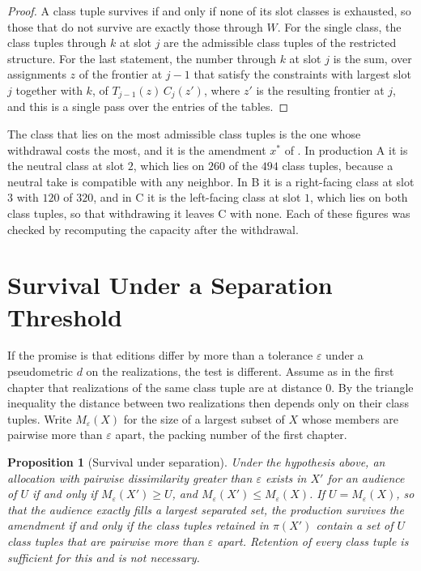 \documentclass[11pt,twoside,openright]{book}
\theoremstyle{plain}
\newtheorem{proposition}[theorem]{Proposition}
\theoremstyle{definition}
\theoremstyle{remark}
\begin{document}
\begin{proof}
A class tuple survives if and only if none of its slot classes is exhausted, so those that do not survive are exactly those through $W$. For the single class, the class tuples through $k$ at slot $j$ are the admissible class tuples of the restricted structure. For the last statement, the number through $k$ at slot $j$ is the sum, over assignments $z$ of the frontier at $j-1$ that satisfy the constraints with largest slot $j$ together with $k$, of $T_{j-1}(z)\,C_j(z')$, where $z'$ is the resulting frontier at $j$, and this is a single pass over the entries of the tables.
\end{proof}

The class that lies on the most admissible class tuples is the one whose withdrawal costs the most, and it is the amendment $x^\ast$ of . In production A it is the neutral class at slot $2$, which lies on $260$ of the $494$ class tuples, because a neutral take is compatible with any neighbor. In B it is a right-facing class at slot $3$ with $120$ of $320$, and in C it is the left-facing class at slot $1$, which lies on both class tuples, so that withdrawing it leaves C with none. Each of these figures was checked by recomputing the capacity after the withdrawal.

\section{Survival Under a Separation Threshold}\label{sec:threshold}

If the promise is that editions differ by more than a tolerance $\varepsilon$ under a pseudometric $d$ on the realizations, the test is different. Assume as in the first chapter that realizations of the same class tuple are at distance $0$. By the triangle inequality the distance between two realizations then depends only on their class tuples. Write $M_\varepsilon(X)$ for the size of a largest subset of $X$ whose members are pairwise more than $\varepsilon$ apart, the packing number of the first chapter.

\begin{proposition}[Survival under separation]\label{prop:sepsurvive}
Under the hypothesis above, an allocation with pairwise dissimilarity greater than $\varepsilon$ exists in $X'$ for an audience of $U$ if and only if $M_\varepsilon(X')\ge U$, and $M_\varepsilon(X')\le M_\varepsilon(X)$. If $U=M_\varepsilon(X)$, so that the audience exactly fills a largest separated set, the production survives the amendment if and only if the class tuples retained in $\pi(X')$ contain a set of $U$ class tuples that are pairwise more than $\varepsilon$ apart. Retention of every class tuple is sufficient for this and is not necessary.
\end{proposition}
\end{document}
